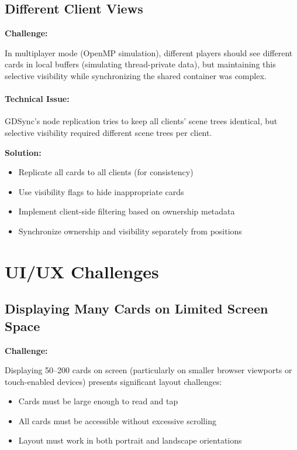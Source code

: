 \subsection{Different Client Views}
\label{subsec:client-views}

\textbf{Challenge:}

In multiplayer mode (OpenMP simulation), different players should see different cards in local buffers (simulating thread-private data), but maintaining this selective visibility while synchronizing the shared container was complex.

\paragraph*{Technical Issue:}

GDSync's node replication tries to keep all clients' scene trees identical, but selective visibility required different scene trees per client.

\textbf{Solution:}

\begin{itemize}
    \item Replicate all cards to all clients (for consistency)
    \item Use visibility flags to hide inappropriate cards
    \item Implement client-side filtering based on ownership metadata
    \item Synchronize ownership and visibility separately from positions
\end{itemize}

\section{UI/UX Challenges}
\label{sec:mobile-ux-challenges}

\subsection{Displaying Many Cards on Limited Screen Space}
\label{subsec:many-cards-small-screens}

\textbf{Challenge:}

Displaying 50--200 cards on screen (particularly on smaller browser viewports or touch-enabled devices) presents significant layout challenges:
\begin{itemize}
    \item Cards must be large enough to read and tap
    \item All cards must be accessible without excessive scrolling
    \item Layout must work in both portrait and landscape orientations
\end{itemize}

